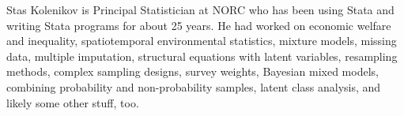 \begin{stlog} 
  \nullskip
\end{stlog}

\begin{stlog} 
  \nullskip
\end{stlog}

\begin{stlog} 
  \nullskip
\end{stlog}

\begin{stlog} 
  \nullskip
\end{stlog}

\begin{stlog} 
  \nullskip
\end{stlog}

\begin{stlog} 
  \nullskip
\end{stlog}

\begin{stlog} 
  \nullskip
\end{stlog}

\newpage

% 
% 




\begin{aboutauthors}
Stas Kolenikov is Principal Statistician at NORC who has been
using Stata and writing Stata programs for about 25 years.
He had worked on economic welfare and inequality, spatiotemporal
environmental statistics, mixture models, missing data,
multiple imputation, structural equations with latent variables,
resampling methods, complex sampling designs, survey weights,
Bayesian mixed models, combining probability and non-probability samples,
latent class analysis, and likely some other stuff, too.
\end{aboutauthors}

\endinput
